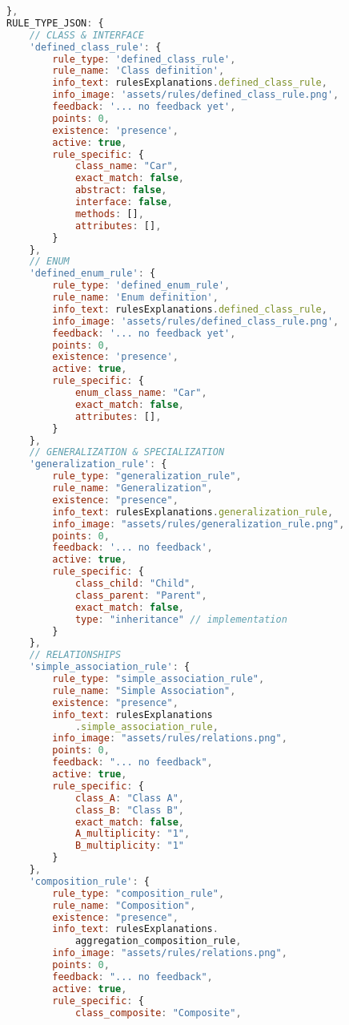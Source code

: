 \begin{lstlisting}[caption={Rules Definition JSON}, label={lst:rules_def}, language=javascript]
},
RULE_TYPE_JSON: {
    // CLASS & INTERFACE
    'defined_class_rule': {
        rule_type: 'defined_class_rule',
        rule_name: 'Class definition',
        info_text: rulesExplanations.defined_class_rule,
        info_image: 'assets/rules/defined_class_rule.png',
        feedback: '... no feedback yet',
        points: 0,
        existence: 'presence',
        active: true,
        rule_specific: {
            class_name: "Car",
            exact_match: false,
            abstract: false,
            interface: false,
            methods: [],
            attributes: [],
        }
    },
    // ENUM
    'defined_enum_rule': {
        rule_type: 'defined_enum_rule',
        rule_name: 'Enum definition',
        info_text: rulesExplanations.defined_class_rule,
        info_image: 'assets/rules/defined_class_rule.png',
        feedback: '... no feedback yet',
        points: 0,
        existence: 'presence',
        active: true,
        rule_specific: {
            enum_class_name: "Car",
            exact_match: false,
            attributes: [],
        }
    },
    // GENERALIZATION & SPECIALIZATION
    'generalization_rule': {
        rule_type: "generalization_rule",
        rule_name: "Generalization",
        existence: "presence",
        info_text: rulesExplanations.generalization_rule,
        info_image: "assets/rules/generalization_rule.png",
        points: 0,
        feedback: '... no feedback',
        active: true,
        rule_specific: {
            class_child: "Child",
            class_parent: "Parent",
            exact_match: false,
            type: "inheritance" // implementation
        }
    },
    // RELATIONSHIPS
    'simple_association_rule': {
        rule_type: "simple_association_rule",
        rule_name: "Simple Association",
        existence: "presence",
        info_text: rulesExplanations
            .simple_association_rule,
        info_image: "assets/rules/relations.png",
        points: 0,
        feedback: "... no feedback",
        active: true,
        rule_specific: {
            class_A: "Class A",
            class_B: "Class B",
            exact_match: false,
            A_multiplicity: "1",
            B_multiplicity: "1"
        }
    },
    'composition_rule': {
        rule_type: "composition_rule",
        rule_name: "Composition",
        existence: "presence",
        info_text: rulesExplanations.
            aggregation_composition_rule,
        info_image: "assets/rules/relations.png",
        points: 0,
        feedback: "... no feedback",
        active: true,
        rule_specific: {
            class_composite: "Composite",

\end{lstlisting}
